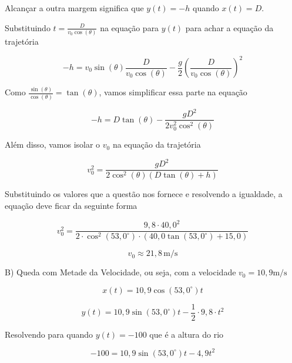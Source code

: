 \documentclass[a4paper, 12pt]{article}
\begin{document}
\begin{flushleft}
		Alcançar a outra margem significa que $y(t) = -h$ quando $x(t) = D$.
		
		Substituindo $t = \frac{D}{v_0 \cos(\theta)}$ na equação para $y(t)$ para achar a equação da trajetória
		
		\begin{equation*}
			-h = v_0 \sin(\theta) \frac{D}{v_0 \cos(\theta)} - \frac{g}{2} \left(\frac{D}{v_0 \cos(\theta)}\right)^2
		\end{equation*}
		
		Como $\frac{\sin(\theta)}{\cos(\theta)} = \tan(\theta)$, vamos simplificar essa parte na equação
		
		\begin{equation*}
			-h = D \tan(\theta) - \frac{gD^2}{2v_0^2 \cos^2(\theta)}
		\end{equation*}
		
		Além disso, vamos isolar o $v_0$ na equação da trajetória
		
		\begin{equation*}
			v_0^2 = \frac{gD^2}{2\cos^2(\theta)(D \tan(\theta) + h)}
		\end{equation*}
		
		Substituindo os valores que a questão nos fornece e resolvendo a igualdade, a equação deve ficar da seguinte forma
		
		\begin{equation*}
			v_0^2 = \frac{9,8 \cdot 40,0^2}{2 \cdot \cos^2(53,0^\circ) \cdot (40,0 \tan(53,0^\circ) + 15,0)}
		\end{equation*}
		
		\begin{equation*}
			v_0 \approx 21,8 \, \text{m/s}
		\end{equation*}	
		
		B) Queda com Metade da Velocidade, ou seja, com a velocidade $v_0 = 10,9 \text{m/s}$
		
		\begin{equation*}
			x(t) = 10,9 \cos(53,0^\circ) t
		\end{equation*}
		
		\begin{equation*}
			y(t) = 10,9 \sin(53,0^\circ) t - \frac{1}{2} \cdot 9,8 \cdot t^2
		\end{equation*}
		
		Resolvendo para quando $y(t) = -100$ que é a altura do rio
		
		\begin{equation*}
			-100 = 10,9 \sin(53,0^\circ) t - 4,9t^2
		\end{equation*}
		

\end{flushleft}
\end{document}
